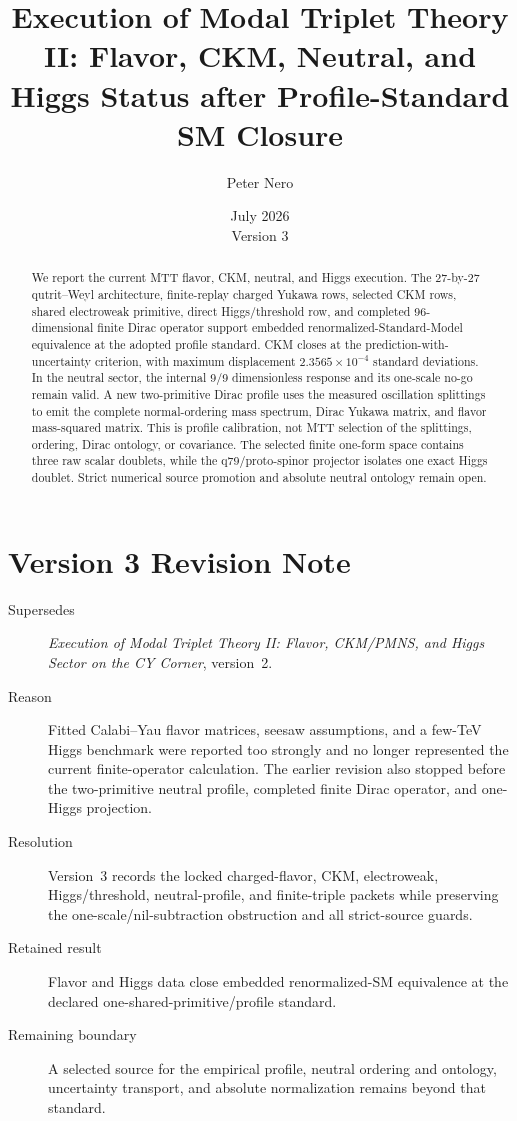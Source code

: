 \documentclass[11pt]{article}
\title{Execution of Modal Triplet Theory II:
Flavor, CKM, Neutral, and Higgs Status after Profile-Standard SM Closure}
\author{Peter Nero}
\date{July 2026\\Version 3}
\begin{document}
\maketitle

\begin{abstract}
We report the current MTT flavor, CKM, neutral, and Higgs execution. The
27-by-27 qutrit--Weyl architecture, finite-replay charged Yukawa rows,
selected CKM rows, shared electroweak primitive, direct Higgs/threshold row,
and completed 96-dimensional finite Dirac operator support embedded
renormalized-Standard-Model equivalence at the adopted profile standard. CKM
closes at the prediction-with-uncertainty criterion, with maximum displacement
$2.3565\times10^{-4}$ standard deviations. In the neutral sector, the
internal 9/9 dimensionless response and its one-scale no-go remain valid. A
new two-primitive Dirac profile uses the measured oscillation splittings to
emit the complete normal-ordering mass spectrum, Dirac Yukawa matrix, and
flavor mass-squared matrix. This is profile calibration, not MTT selection of
the splittings, ordering, Dirac ontology, or covariance. The selected finite
one-form space contains three raw scalar doublets, while the q79/proto-spinor
projector isolates one exact Higgs doublet. Strict numerical source promotion
and absolute neutral ontology remain open.
\end{abstract}

\section*{Version 3 Revision Note}
\begin{description}
\item[Supersedes] \emph{Execution of Modal Triplet Theory II: Flavor,
CKM/PMNS, and Higgs Sector on the CY Corner}, version~2.
\item[Reason] Fitted Calabi--Yau flavor matrices, seesaw assumptions, and a
few-TeV Higgs benchmark were reported too strongly and no longer represented
the current finite-operator calculation. The earlier revision also stopped
before the two-primitive neutral profile, completed finite Dirac operator, and
one-Higgs projection.
\item[Resolution] Version~3 records the locked charged-flavor, CKM,
electroweak, Higgs/threshold, neutral-profile, and finite-triple packets while
preserving the one-scale/nil-subtraction obstruction and all strict-source
guards.
\item[Retained result] Flavor and Higgs data close embedded renormalized-SM
equivalence at the declared one-shared-primitive/profile standard.
\item[Remaining boundary] A selected source for the empirical profile,
neutral ordering and ontology, uncertainty transport, and absolute
normalization remains beyond that standard.
\end{description}
\end{document}
